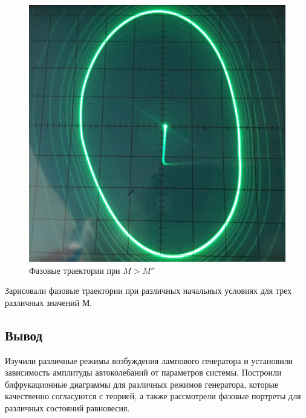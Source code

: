 \begin{figure}[h!]
\begin{minipage}{0.32\linewidth}
	\end{minipage}
	\begin{minipage}{0.32\linewidth}
	\includegraphics[width=\linewidth]{photo/task3b(rightL2).jpg}
	\end{minipage}
	\caption{Фазовые траектории при $M>M''$}
	\label{fig15}
\end{figure}
Зарисовали фазовые траектории при различных начальных условиях для трех различных значений $М$.
\subsection{Вывод}
Изучили различные режимы возбуждения лампового генератора и установили зависимость амплитуды автоколебаний от параметров системы. Построили бифрукационные диаграммы для различных режимов генератора, которые качественно согласуются с теорией, а также рассмотрели фазовые портреты для различных состояний равновесия.


